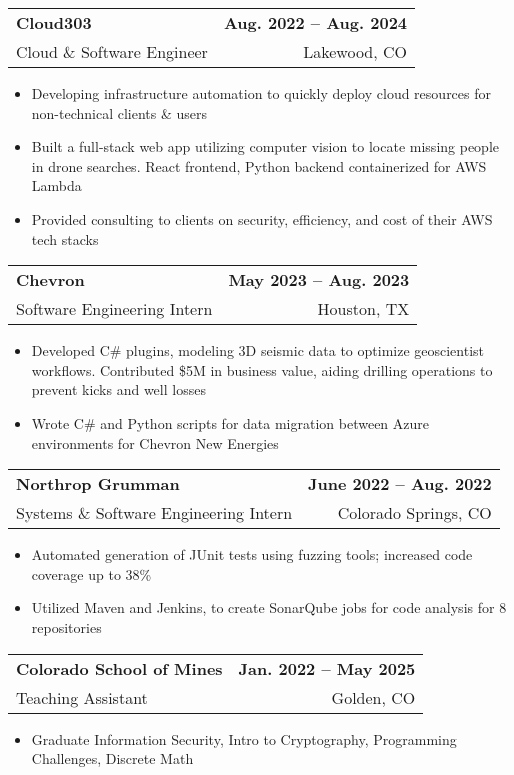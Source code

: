 \documentclass[11pt, letterpaper]{article}
\makeatletter
\newcommand{\resumeItem}[1]{
  \item\small{
    {#1 \vspace{-2pt}}
  }
}
\newcommand{\resumeSubheading}[4]{
  \vspace{-2pt}\item
    \begin{tabular*}{1.0\textwidth}[t]{l@{\extracolsep{\fill}}r}
      \textbf{#1} & \textbf{\small #2} \\
      {\small#3} & {\small #4} \\
    \end{tabular*}\vspace{-7pt}
}
\newcommand{\resumeItemListStart}{\begin{itemize}}
\newcommand{\resumeItemListEnd}{\end{itemize}\vspace{-5pt}}
\makeatother
\begin{document}
    \resumeSubheading
      {Cloud303}{Aug. 2022 -- Aug. 2024}
      {Cloud \& Software Engineer}{Lakewood, CO}
      \resumeItemListStart
        \resumeItem{Developing infrastructure automation to quickly deploy cloud resources for non-technical clients \& users }
        \resumeItem{Built a full-stack web app utilizing computer vision to locate missing people in drone searches. React frontend, Python backend containerized for AWS Lambda}
        \resumeItem{Provided consulting to clients on security, efficiency, and cost of their AWS tech stacks}
      \resumeItemListEnd

    \resumeSubheading
      {Chevron}{May 2023 -- Aug. 2023}
      {Software Engineering Intern}{Houston, TX}
      \resumeItemListStart
        \resumeItem{
          Developed C\# plugins, modeling 3D seismic data to optimize geoscientist workflows. 
          Contributed \$5M in business value, aiding drilling operations to prevent kicks and well losses}
        \resumeItem{Wrote C\# and Python scripts for data migration between Azure environments for Chevron New Energies}
      \resumeItemListEnd
      
    
    \resumeSubheading
      {Northrop Grumman}{June 2022 -- Aug. 2022}
      {Systems \& Software Engineering Intern}{Colorado Springs, CO}
      \resumeItemListStart
        \resumeItem{Automated generation of JUnit tests using fuzzing tools; increased code coverage up to 38\%}
        \resumeItem{Utilized Maven and Jenkins, to create SonarQube jobs for code analysis for 8 repositories}
    \resumeItemListEnd

    \resumeSubheading
    {Colorado School of Mines}{Jan. 2022 -- May 2025}
    {Teaching Assistant}{Golden, CO}
    \resumeItemListStart
      \resumeItem{Graduate Information Security, Intro to Cryptography, Programming Challenges, Discrete Math}
    \resumeItemListEnd

\end{document}
